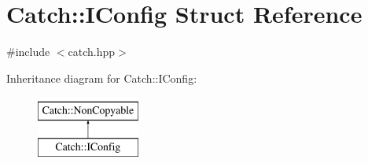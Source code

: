 \section{Catch\+::I\+Config Struct Reference}
\label{struct_catch_1_1_i_config}


{\ttfamily \#include $<$catch.\+hpp$>$}

Inheritance diagram for Catch\+::I\+Config\+:\begin{figure}[H]
\begin{center}
\leavevmode
\includegraphics[height=2.000000cm]{struct_catch_1_1_i_config}
\end{center}
\end{figure}

